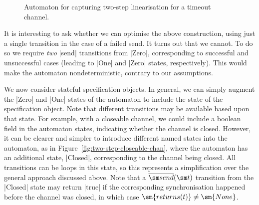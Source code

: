 %
\begin{figure}
\begin{center}
\end{center}
\caption{Automaton for capturing two-step linearisation for a timeout
  channel.}
\label{fig:two-step-timeout-chan}
\end{figure}


It is interesting to ask whether we can optimise the above construction, using
just a single transition in the case of a failed send.  It turns out that we
cannot.  To do so we require \emph{two} |send| transitions from |Zero|,
corresponding to successful and unsuccessful cases (leading to |One| and
|Zero| states, respectively).  This would make the automaton nondeterministic,
contrary to our assumptions.


We now consider stateful specification objects.  In general, we can simply
augment the |Zero| and |One| states of the automaton to include the state of
the specification object.  Note that different transitions may be available
based upon that state.  For example, with a closeable channel, we could
include a boolean field in the automaton states, indicating whether the
channel is closed.  However, it can be clearer and simpler to introduce
different named states into the automaton, as in
Figure~\ref{fig:two-step-closeable-chan}, where the automaton has an
additional state, |Closed|, corresponding to the channel being closed.  All
transitions can be loops in this state, so this represents a simplification
over the general approach discussed above.  Note that a $\overline{\send}(\sm
t)$ transition from the |Closed| state may return |true| if the corresponding
synchronisation happened before the channel was closed, in which case
$\sm{returns(t)} \ne \sm{None}$.

